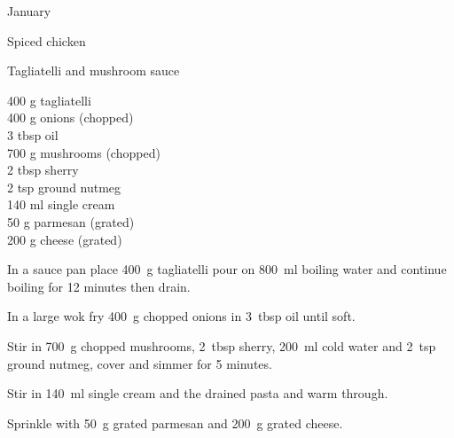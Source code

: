 \begin{menu}{January}
\begin{recipe}{2}{Spiced chicken}
\begin{instructions}
    \end{instructions}
    \end{recipe}%
  
    \begin{recipe}{2}{Tagliatelli and mushroom sauce}%
		\begin{ingredients}
		400 g tagliatelli  \\
	400 g onions (chopped) \\
	3 tbsp oil  \\
	700 g mushrooms (chopped) \\
	2 tbsp sherry  \\
	2 tsp ground nutmeg  \\
	140 ml single cream  \\
	50 g parmesan (grated) \\
	200 g cheese (grated) \\
	
		\end{ingredients}
	
    \begin{instructions}
    \item 
      In a
      sauce pan
      place
      400~g  tagliatelli
      pour on
      800~ml  boiling water and continue boiling for 12 minutes then drain.
    \item 
        In a large wok fry
        400~g chopped onions
        in
        3~tbsp  oil
        until soft.
      \item 
        Stir in
        700~g chopped mushrooms,
        2~tbsp  sherry,
        200~ml  cold water
        and
        2~tsp  ground nutmeg,
        cover and simmer for 5 minutes.
      \item 
        Stir in
        140~ml  single cream
        and the drained pasta
        and warm through.
      \item 
        Sprinkle with
        50~g grated parmesan
        and
        200~g grated cheese.
      
    \end{instructions}
    \end{recipe}%
  

\end{menu}
